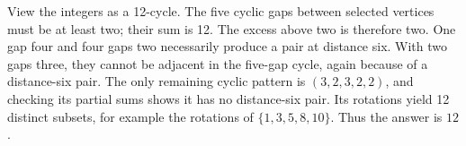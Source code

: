 View the integers as a 12-cycle. The five cyclic gaps between selected vertices must be at least two; their sum is 12. The excess above two is therefore two. One gap four and four gaps two necessarily produce a pair at distance six. With two gaps three, they cannot be adjacent in the five-gap cycle, again because of a distance-six pair. The only remaining cyclic pattern is $(3,2,3,2,2)$, and checking its partial sums shows it has no distance-six pair. Its rotations yield 12 distinct subsets, for example the rotations of $\{1,3,5,8,10\}$. Thus the answer is $\boxed{12}$.
